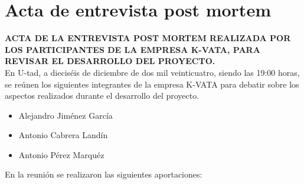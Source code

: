 \chapter{Acta de entrevista post mortem}

\textbf{ACTA DE LA ENTREVISTA POST MORTEM REALIZADA POR LOS PARTICIPANTES DE LA EMPRESA K-VATA, PARA REVISAR EL DESARROLLO DEL PROYECTO.}\\

En U-tad, a dieciséis de diciembre de dos mil veinticuatro, siendo las 19:00 horas, se reúnen los siguientes integrantes de la empresa K-VATA para debatir sobre los aspectos realizados durante el desarrollo del proyecto.

\begin{itemize}
    \item Alejandro Jiménez García
    \item Antonio Cabrera Landín
    \item Antonio Pérez Marquéz
\end{itemize}

En la reunión se realizaron las siguientes aportaciones:

